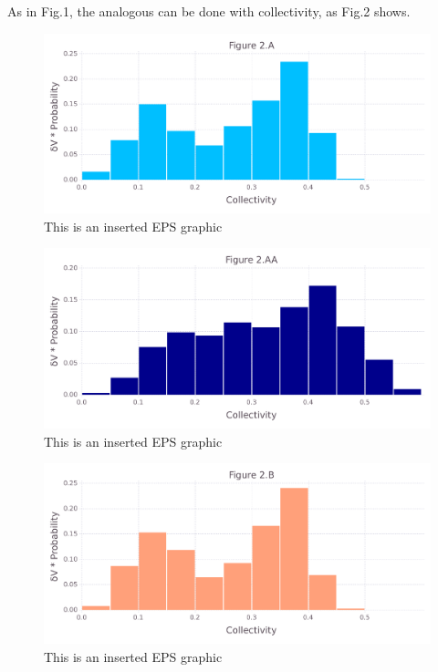 \documentclass[10pt,letterpaper]{article}
\begin{document}
\clearpage
As in Fig.1, the analogous can be done with collectivity, as Fig.2 shows.

\begin{figure}[ht]
\begin{center}
\includegraphics[scale=0.5]{1prn/2afigure_very_hi-precision.pdf}
\caption{This is an inserted EPS graphic}
\label{fig3}
\end{center}
\end{figure}

\begin{figure}[ht]
\begin{center}
\includegraphics[scale=0.5]{1prn/2aafigure_very_hi-precision.pdf}
\caption{This is an inserted EPS graphic}
\label{fig4}
\end{center}
\end{figure}

\begin{figure}[ht]
\begin{center}
\includegraphics[scale=0.5]{1prn/2bfigure_very_hi-precision.pdf}
\caption{This is an inserted EPS graphic}
\label{fig5}
\end{center}
\end{figure}
\end{document}

